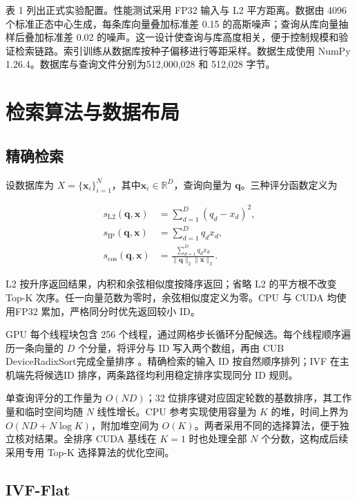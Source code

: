 \documentclass[UTF8,a4paper,zihao=5,fontset=none]{ctexart}
\begin{document}
表 1 列出正式实验配置。性能测试采用 FP32 输入与 L2 平方距离。数据由 4096 个标准正态中心生成，每条库向量叠加标准差 0.15 的高斯噪声；查询从库向量抽样后叠加标准差 0.02 的噪声。这一设计使查询与库高度相关，便于控制规模和验证检索链路。索引训练从数据库按种子偏移进行等距采样。数据生成使用 NumPy 1.26.4。数据库与查询文件分别为512,000,028 和 512,028 字节。


\section{检索算法与数据布局}

\subsection{精确检索}

设数据库为 $X=\{\boldsymbol{x}_i\}_{i=1}^{N}$，其中$\boldsymbol{x}_i\in\mathbb{R}^{D}$，查询向量为 $\boldsymbol{q}$。三种评分函数定义为


\nopagebreak[4]
\begin{equation}
\label{eq:1}
\begin{aligned}
s_{\mathrm{L2}}(\boldsymbol{q},\boldsymbol{x})
  &= \sum_{d=1}^{D}(q_d-x_d)^2,\\
s_{\mathrm{IP}}(\boldsymbol{q},\boldsymbol{x})
  &= \sum_{d=1}^{D}q_dx_d,\\
s_{\mathrm{cos}}(\boldsymbol{q},\boldsymbol{x})
  &= \frac{\sum_{d=1}^{D}q_dx_d}
  {\lVert\boldsymbol{q}\rVert_2\lVert\boldsymbol{x}\rVert_2}.
\end{aligned}
\end{equation}

L2 按升序返回结果，内积和余弦相似度按降序返回；省略 L2 的平方根不改变Top-K 次序。任一向量范数为零时，余弦相似度定义为零。CPU 与 CUDA 均使用FP32 累加，严格同分时优先返回较小 ID。


GPU 每个线程块包含 256 个线程，通过网格步长循环分配候选。每个线程顺序遍历一条向量的 $D$ 个分量，将评分与 ID 写入两个数组，再由 CUB DeviceRadixSort完成全量排序 \cite{r7}。精确检索的输入 ID 按自然顺序排列；IVF 在主机端先将候选ID 排序，两条路径均利用稳定排序实现同分 ID 规则。


单查询评分的工作量为 $O(ND)$；32 位排序键对应固定轮数的基数排序，其工作量和临时空间均随 $N$ 线性增长。CPU 参考实现使用容量为 $K$ 的堆，时间上界为$O(ND+N\log K)$，附加堆空间为 $O(K)$。两者采用不同的选择算法，便于独立核对结果。全排序 CUDA 基线在 $K=1$ 时也处理全部 $N$ 个分数，这构成后续采用专用 Top-K 选择算法的优化空间。


\subsection{IVF-Flat}
\end{document}
